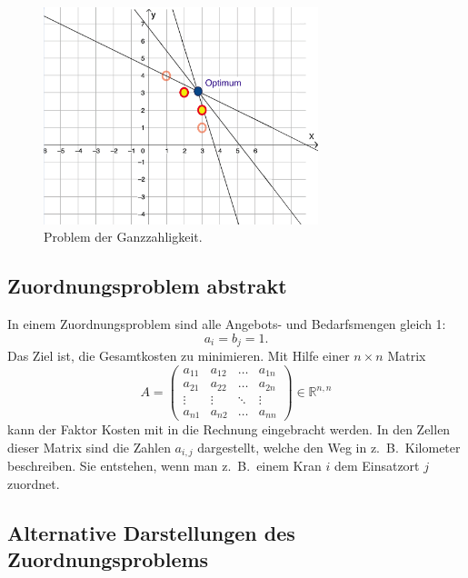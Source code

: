 \begin{figure}
\centering
\includegraphics[width=8cm]{papers/munkres/figures/ganzzahlige_punkte}
\caption{Problem der Ganzzahligkeit.}
\label{munkres:Vr2}
\end{figure}


\subsection{Zuordnungsproblem abstrakt
\label{munkres:subsection:bonorum}}

In einem Zuordnungsproblem sind alle Angebots- und Bedarfsmengen gleich 1:
\begin{equation}
a_{i}=b_{j}=1.
\end{equation}
Das Ziel ist, die Gesamtkosten zu minimieren. Mit Hilfe einer $n\times n$ Matrix 
\[
A
=
\begin{pmatrix}
a_{11}&a_{12}&\dots &a_{1n}\\
a_{21}&a_{22}&\dots &a_{2n}\\
\vdots&\vdots&\ddots&\vdots\\
a_{n1}&a_{n2}&\dots &a_{nn}
\end{pmatrix}
\in \mathbb{R}^{n,n}
\]
kann der Faktor Kosten mit in die Rechnung eingebracht werden.
In den Zellen dieser Matrix sind die Zahlen $a_{i,j}$ dargestellt, welche den Weg in z.~B.~Kilometer beschreiben.
Sie entstehen, wenn man z.~B.~einem Kran $i$ dem Einsatzort $j$ zuordnet.

\subsection{Alternative Darstellungen des Zuordnungsproblems
\label{munkres:subsection:bonorum}}
